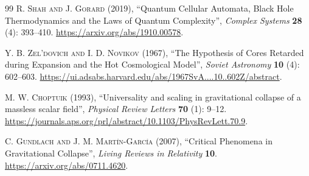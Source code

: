 \documentclass{article}
\begin{document}
\begin{thebibliography}{99}
\textsc{R. Shah and J. Gorard} (2019), ``Quantum Cellular Automata, Black Hole Thermodynamics and the Laws of Quantum Complexity'', \textit{Complex Systems} \textbf{28} (4): 393--410. \url{https://arxiv.org/abs/1910.00578}.

\textsc{Y. B. Zel'dovich and I. D. Novikov} (1967), ``The Hypothesis of Cores Retarded during Expansion and the Hot Cosmological Model'', \textit{Soviet Astronomy} \textbf{10} (4): 602--603. \url{https://ui.adsabs.harvard.edu/abs/1967SvA....10..602Z/abstract}.

\textsc{M. W. Choptuik} (1993), ``Universality and scaling in gravitational collapse of a massless scalar field'', \textit{Physical Review Letters} \textbf{70} (1): 9--12. \url{https://journals.aps.org/prl/abstract/10.1103/PhysRevLett.70.9}.

\textsc{C. Gundlach and J. M. Mart\'in-Garc\'ia} (2007), ``Critical Phenomena in Gravitational Collapse'', \textit{Living Reviews in Relativity} \textbf{10}. \url{https://arxiv.org/abs/0711.4620}.
\end{thebibliography}
\end{document}
